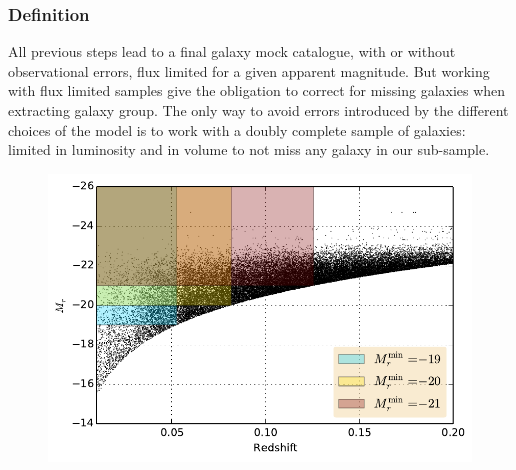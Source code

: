 \subsubsection{Definition}
\label{ssub:galaxy_sample_definition}

All previous steps lead to a final galaxy mock catalogue, with or without
observational errors, flux limited for a given apparent magnitude. But working
with flux limited samples give the obligation to correct for missing galaxies
when extracting galaxy group. The only way to avoid errors introduced by the
different choices of the model is to work with a doubly complete sample of
galaxies: limited in luminosity and in volume to not miss any galaxy in our
sub-sample.
%
\begin{figure}[htb]
    \centering
    \begin{minipage}{0.49\linewidth}
        \includegraphics[width=\linewidth]{figures/mock/subsamples.pdf}
    \end{minipage}
    \begin{minipage}{0.49\linewidth}

\end{minipage}
\end{figure}
